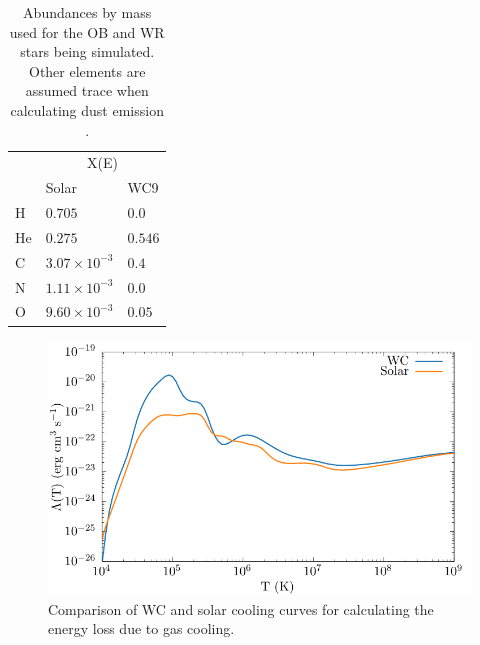 \documentclass[fleqn,usenatbib]{mnras}
\begin{document}
\begin{table}
  \centering
  \begin{tabular}{@{}lll@{}}
  \toprule
  \multicolumn{1}{l}{} & \multicolumn{2}{c}{X(E)} \\ \cmidrule(l){2-3} 
   & Solar & WC9 \\ \midrule
  H & $0.705$ & $0.0$ \\
  He & $0.275$ & $0.546$ \\
  C & $3.07 \times 10^{-3}$ & $0.4$ \\
  N & $1.11 \times 10^{-3}$ & $0.0$ \\
  O & $9.60 \times 10^{-3}$ & $0.05$ \\
  \hline
  \end{tabular}
  \caption[Abundances by mass used for OB and WR stars]{Abundances by mass used for the OB and WR stars being simulated. Other elements are assumed trace when calculating dust emission \citep{williamsSpectraWC9Stars2015}.}
  \label{tab:abundances}
\end{table}


\begin{figure}
  \centering
  \includegraphics[width=\linewidth]{assets/cooling-curve/cooling-curve-no-elements.pdf}
  \caption[WR and OB $\Lambda(T)$ cooling curves]{Comparison of WC and solar cooling curves for calculating the energy loss due to gas cooling.}
  \label{fig:cooling-curve}
\end{figure}
\end{document}
